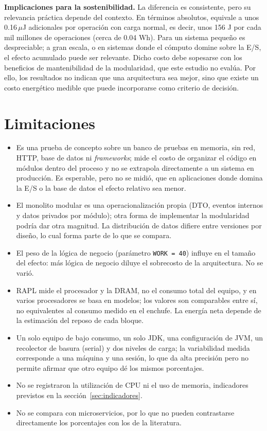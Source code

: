 \textbf{Implicaciones para la sostenibilidad.} La diferencia es consistente, pero su relevancia práctica depende del contexto. En términos absolutos, equivale a unos 0.16\,$\mu$J adicionales por operación con carga normal, es decir, unos 156 J por cada mil millones de operaciones (cerca de 0.04 Wh). Para un sistema pequeño es despreciable; a gran escala, o en sistemas donde el cómputo domine sobre la E/S, el efecto acumulado puede ser relevante. Dicho costo debe sopesarse con los beneficios de mantenibilidad de la modularidad, que este estudio no evalúa. Por ello, los resultados no indican que una arquitectura sea mejor, sino que existe un costo energético medible que puede incorporarse como criterio de decisión.

\section{Limitaciones}
\label{sec:limitaciones}

\begin{itemize}
  \item Es una prueba de concepto sobre un banco de pruebas en memoria, sin red, HTTP, base de datos ni \textit{frameworks}; mide el costo de organizar el código en módulos dentro del proceso y no se extrapola directamente a un sistema en producción. Es esperable, pero no se midió, que en aplicaciones donde domina la E/S o la base de datos el efecto relativo sea menor.
  \item El monolito modular es una operacionalización propia (DTO, eventos internos y datos privados por módulo); otra forma de implementar la modularidad podría dar otra magnitud. La distribución de datos difiere entre versiones por diseño, lo cual forma parte de lo que se compara.
  \item El peso de la lógica de negocio (parámetro \texttt{WORK = 40}) influye en el tamaño del efecto: más lógica de negocio diluye el sobrecosto de la arquitectura. No se varió.
  \item RAPL mide el procesador y la DRAM, no el consumo total del equipo, y en varios procesadores se basa en modelos; los valores son comparables entre sí, no equivalentes al consumo medido en el enchufe. La energía neta depende de la estimación del reposo de cada bloque.
  \item Un solo equipo de bajo consumo, un solo JDK, una configuración de JVM, un recolector de basura (serial) y dos niveles de carga; la variabilidad medida corresponde a una máquina y una sesión, lo que da alta precisión pero no permite afirmar que otro equipo dé los mismos porcentajes.
  \item No se registraron la utilización de CPU ni el uso de memoria, indicadores previstos en la sección~\ref{sec:indicadores}.
  \item No se compara con microservicios, por lo que no pueden contrastarse directamente los porcentajes con los de la literatura.
\end{itemize}